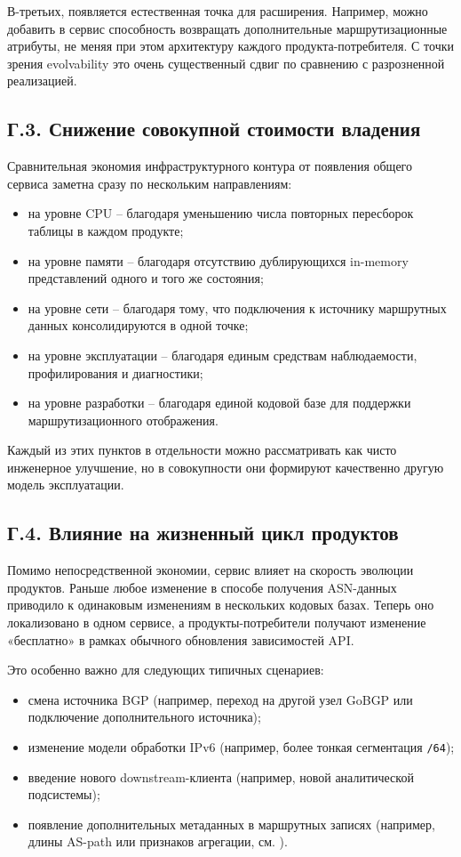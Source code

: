 В-третьих, появляется естественная точка для расширения. Например,
можно добавить в сервис способность возвращать дополнительные
маршрутизационные атрибуты, не меняя при этом архитектуру каждого
продукта-потребителя. С точки зрения evolvability это очень
существенный сдвиг по сравнению с разрозненной реализацией.

\subsection*{Г.3. Снижение совокупной стоимости владения}

Сравнительная экономия инфраструктурного контура от появления
общего сервиса заметна сразу по нескольким направлениям:

\begin{itemize}
\item на уровне CPU -- благодаря уменьшению числа повторных пересборок
таблицы в каждом продукте;
\item на уровне памяти -- благодаря отсутствию дублирующихся
in-memory представлений одного и того же состояния;
\item на уровне сети -- благодаря тому, что подключения к источнику
маршрутных данных консолидируются в одной точке;
\item на уровне эксплуатации -- благодаря единым средствам
наблюдаемости, профилирования и диагностики;
\item на уровне разработки -- благодаря единой кодовой базе для
поддержки маршрутизационного отображения.
\end{itemize}

Каждый из этих пунктов в отдельности можно рассматривать как чисто
инженерное улучшение, но в совокупности они формируют качественно
другую модель эксплуатации.

\subsection*{Г.4. Влияние на жизненный цикл продуктов}

Помимо непосредственной экономии, сервис влияет на скорость
эволюции продуктов. Раньше любое изменение в способе получения
ASN-данных приводило к одинаковым изменениям в нескольких кодовых
базах. Теперь оно локализовано в одном сервисе, а продукты-потребители
получают изменение «бесплатно» в рамках обычного обновления
зависимостей API.

Это особенно важно для следующих типичных сценариев:

\begin{itemize}
\item смена источника BGP (например, переход на другой узел GoBGP
или подключение дополнительного источника);
\item изменение модели обработки IPv6 (например, более тонкая
сегментация \texttt{/64});
\item введение нового downstream-клиента (например, новой
аналитической подсистемы);
\item появление дополнительных метаданных в маршрутных записях
(например, длины AS-path или признаков агрегации, см.
\cite{rfc4632}).
\end{itemize}

